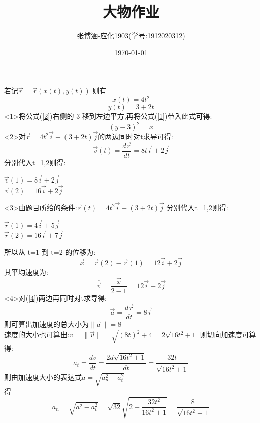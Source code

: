 \documentclass{article}
\title{大物作业}
\author{张博涵-应化1903(学号:1912020312)}
\date{\today}
\begin{document}
	\maketitle
	若记$\vec { r }=\vec { r }(x(t),y(t))$
	则有
	\begin{equation}
    x(t)=4t^2\label{1}
	\end{equation}
	\begin{equation}
    y(t)=3+2t\label{2}
	\end{equation}
	<1>将公式(\ref{2})右侧的 3 移到左边平方,再将公式(\ref{1})带入此式可得:
	\begin{equation}
    (y-3)^2=x\label{3}
	\end{equation}
	<2>对$\vec{ r }=4t^2\vec{ i }+(3+2t)\vec{ j }$的两边同时对t求导可得:
	\begin{equation}
    \vec{ v }(t)=\frac { d \vec { r } } { d t } = 8 t \vec { i } + 2 \vec { j }\label{4}
	\end{equation}
	分别代入t=1,2则得:
	\begin{center}
	$\vec{ v }(1)=8\vec { i } + 2\vec { j }$\\
	$\vec{ v }(2)=16\vec { i } + 2\vec { j }$
	\end{center}
	<3>由题目所给的条件:$\vec { r }(t)=4t^2\vec { i }+(3+2t)\vec { j }$
	分别代入t=1,2则得:
	\begin{center}
	$\vec { r }(1)=4\vec { i }+5\vec { j }$\\
	$\vec { r }(2)=16\vec { i }+7\vec { j }$
	\end{center}
	所以从 t=1 到 t=2 的位移为:
	$$\vec { x }=\vec { r }(2)-\vec { r }(1)=12\vec { i }+2\vec { j }$$
	其平均速度为:
	$$\overline{\vec { v }}=\frac{\vec{ x }}{2-1}=12\vec { i }+2\vec { j }$$
	<4>对(\ref{4})两边再同时对t求导得:
	$$\vec{ a }=\frac{d\vec{r}}{dt}=8\vec{ i }$$
	则可算出加速度的总大小为$ \| \vec { a } \|=8$\\
	速度的大小也可算出:$v=\| \vec { v } \|=\sqrt { ( 8 t ) ^ { 2 } + 4 }=2\sqrt{16t^2+1}$
	则切向加速度可算得:$$a_t=\frac{dv}{dt}=\frac{2d\sqrt{16t^2+1}}{dt}=\frac{32t}{\sqrt{16t^2+1}}$$
	则由加速度大小的表达式$a=\sqrt{a _ { n } ^ { 2 }+a _ { t } ^ { 2 }}$\\
	得$$a_n=\sqrt{a^2-a_{t} ^{2}}=\sqrt{32}\sqrt{2-\frac{32t^2}{16t^2+1}}=\frac{8}{\sqrt{16t^2+1}}$$
\end{document}
